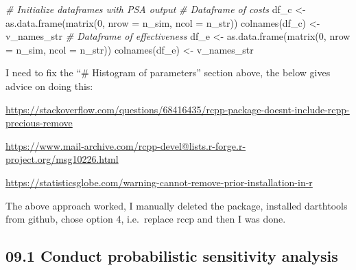 \documentclass[
]{article}
\newenvironment{Shaded}{\begin{snugshade}}{\end{snugshade}}
\newcommand{\AttributeTok}[1]{\textcolor[rgb]{0.77,0.63,0.00}{#1}}
\newcommand{\CommentTok}[1]{\textcolor[rgb]{0.56,0.35,0.01}{\textit{#1}}}
\newcommand{\DecValTok}[1]{\textcolor[rgb]{0.00,0.00,0.81}{#1}}
\newcommand{\FunctionTok}[1]{\textcolor[rgb]{0.00,0.00,0.00}{#1}}
\newcommand{\NormalTok}[1]{#1}
\newcommand{\OtherTok}[1]{\textcolor[rgb]{0.56,0.35,0.01}{#1}}
\begin{document}
\begin{Shaded}
\begin{Highlighting}[]
\CommentTok{\# Initialize dataframes with PSA output }
\CommentTok{\# Dataframe of costs}
\NormalTok{df\_c }\OtherTok{\textless{}{-}} \FunctionTok{as.data.frame}\NormalTok{(}\FunctionTok{matrix}\NormalTok{(}\DecValTok{0}\NormalTok{, }
                             \AttributeTok{nrow =}\NormalTok{ n\_sim,}
                             \AttributeTok{ncol =}\NormalTok{ n\_str))}
\FunctionTok{colnames}\NormalTok{(df\_c) }\OtherTok{\textless{}{-}}\NormalTok{ v\_names\_str}
\CommentTok{\# Dataframe of effectiveness}
\NormalTok{df\_e }\OtherTok{\textless{}{-}} \FunctionTok{as.data.frame}\NormalTok{(}\FunctionTok{matrix}\NormalTok{(}\DecValTok{0}\NormalTok{, }
                             \AttributeTok{nrow =}\NormalTok{ n\_sim,}
                             \AttributeTok{ncol =}\NormalTok{ n\_str))}
\FunctionTok{colnames}\NormalTok{(df\_e) }\OtherTok{\textless{}{-}}\NormalTok{ v\_names\_str}
\end{Highlighting}
\end{Shaded}

I need to fix the ``\# Histogram of parameters'' section above, the
below gives advice on doing this:

\url{https://stackoverflow.com/questions/68416435/rcpp-package-doesnt-include-rcpp-precious-remove}

\url{https://www.mail-archive.com/rcpp-devel@lists.r-forge.r-project.org/msg10226.html}

\url{https://statisticsglobe.com/warning-cannot-remove-prior-installation-in-r}

The above approach worked, I manually deleted the package, installed
darthtools from github, chose option 4, i.e.~replace rccp and then I was
done.

\hypertarget{conduct-probabilistic-sensitivity-analysis}{%
\subsection{09.1 Conduct probabilistic sensitivity
analysis}\label{conduct-probabilistic-sensitivity-analysis}}
\end{document}
